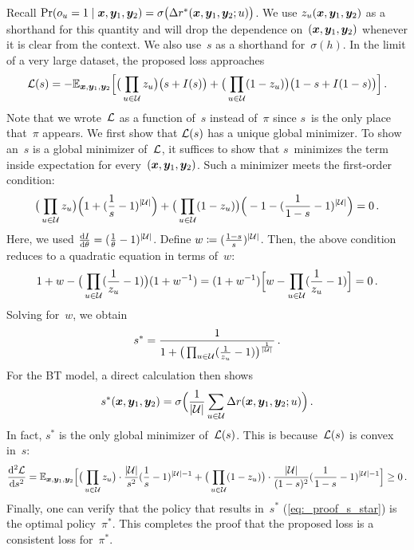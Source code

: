 \begin{proofEnd}
    Recall $\Pr(o_u = 1 \mid {\bm{x}}, {\bm{y}}_1, {\bm{y}}_2) = \sigma\big(\Delta r^*({\bm{x}}, {\bm{y}}_1, {\bm{y}}_2; u)\big)$. We use $z_u({\bm{x}}, {\bm{y}}_1, {\bm{y}}_2)$ as a shorthand for this quantity and will drop the dependence on~$({\bm{x}}, {\bm{y}}_1, {\bm{y}}_2)$ whenever it is clear from the context. We also use~$s$ as a shorthand for~$\sigma(h)$.
    In the limit of a very large dataset, the proposed loss approaches
    \begin{equation*}
        {\mathcal{L}}(s) = -\mathbb{E}_{{\bm{x}}, {\bm{y}}_1, {\bm{y}}_2} \Big[
        \big(\prod_{u \in {\mathcal{U}}} z_u \big) \big(s + I(s)\big)
        + \big(\prod_{u \in {\mathcal{U}}} (1 - z_u) \big) \big(1-s + I(1-s)\big)
        \Big] 
        \,.
    \end{equation*}
    Note that we wrote~${\mathcal{L}}$ as a function of~$s$ instead of~$\pi$ since $s$~is the only place that~$\pi$ appears. We first show that ${\mathcal{L}}(s)$ has a unique global minimizer. To show an~$s$ is a global minimizer of~${\mathcal{L}}$, it suffices to show that $s$~minimizes the term inside expectation for every~$({\bm{x}}, {\bm{y}}_1, {\bm{y}}_2)$. Such a minimizer meets the first-order condition: 
    \begin{equation*}
        \big(\prod_{u \in {\mathcal{U}}} z_u \big)\Big(1 + (\frac{1}{s} - 1)^{|{\mathcal{U}}|} \Big) 
        + \big(\prod_{u \in {\mathcal{U}}} (1 - z_u) \big)\Big(-1 - (\frac{1}{1 - s} - 1)^{|{\mathcal{U}}|} \Big) 
        = 0
        \,.
    \end{equation*}
    Here, we used $\od{I}{\theta} = (\frac{1}{\theta} - 1)^{|\gU|}$. Define $w \coloneqq (\frac{1 - s}{s})^{|{\mathcal{U}}|}$. Then, the above condition reduces to a quadratic equation in terms of~$w$:
    \begin{equation*}
        1 + w - \big(\prod_{u \in {\mathcal{U}}} (\frac{1}{z_u} - 1) \big) (1 + w^{-1}) = (1 + w^{-1})\Big[w - \prod_{u \in {\mathcal{U}}} (\frac{1}{z_u} - 1) \Big] = 0
        \,.
    \end{equation*}
    Solving for~$w$, we obtain
    \begin{equation*}
        s^* = \frac{1}{1 + \big(\prod_{u \in {\mathcal{U}}} (\frac{1}{z_u} - 1) \big)^{\frac{1}{|{\mathcal{U}}|}}}
        \,.
    \end{equation*}
    For the BT model, a direct calculation then shows
    \begin{equation}
    \label{eq:_proof_s_star}
        s^*({\bm{x}}, {\bm{y}}_1, {\bm{y}}_2) = \sigma\Big(\frac{1}{|{\mathcal{U}}|}\sum_{u \in {\mathcal{U}}}\Delta r({\bm{x}}, {\bm{y}}_1, {\bm{y}}_2; u)\Big)
        \,.
    \end{equation}
    In fact, $s^*$ is the only global minimizer of~${\mathcal{L}}(s)$. This is because~${\mathcal{L}}(s)$ is convex in~$s$:
    \begin{equation*}
        \od[2]{\gL}{s} = \E_{\vx, \vy_1, \vy_2}\Big[
        \big(\prod_{u \in \gU} z_u \big) \cdot \frac{|\gU|}{s^2} (\frac{1}{s} - 1)^{|\gU| - 1} 
        + \big(\prod_{u \in \gU} (1 - z_u) \big) \cdot \frac{|\gU|}{(1 - s)^2}(\frac{1}{1 - s} - 1)^{|\gU| - 1} 
        \Big] \ge 0
        \,.
    \end{equation*}
    Finally, one can verify that the policy that results in~$s^*$ (\cref{eq:_proof_s_star}) is the optimal policy~$\pi^*$. This completes the proof that the proposed loss is a consistent loss for~$\pi^*$.  
\end{proofEnd}
